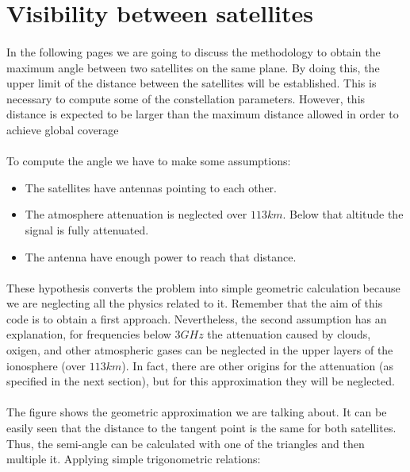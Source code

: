 \section{Visibility between satellites}
\paragraph{}In the following pages we are going to discuss the methodology to obtain the maximum angle between two satellites on the same plane. By doing this, the upper limit of the distance between the satellites will be established. This is necessary to compute some of the constellation parameters. However, this distance is expected to be larger than the maximum distance allowed in order to achieve global coverage

\paragraph{}To compute the angle we have to make some assumptions:
\begin{itemize}
	\item The satellites have antennas pointing to each other.
	\item The atmosphere attenuation is neglected over $113 km$. Below that altitude the signal is fully attenuated.
	\item The antenna have enough power to reach that distance. 
\end{itemize}

\paragraph{}These hypothesis converts the problem into simple geometric calculation because we are neglecting all the physics related to it. Remember that the aim of this code is to obtain a first approach. Nevertheless, the second assumption has an explanation, for frequencies below $3 GHz$ the attenuation caused by clouds, oxigen, and other atmospheric gases can be neglected in the upper layers of the ionosphere (over $113 km$)\cite{Zubair2011}. In fact, there are other origins for the attenuation (as specified in the next section), but for this approximation they will be neglected.

\paragraph{}The figure \cite{diagram} shows the geometric approximation we are talking about. It can be easily seen that the distance to the tangent point is the same for both satellites. Thus, the semi-angle can be calculated with one of the triangles and then multiple it. Applying simple trigonometric relations:

